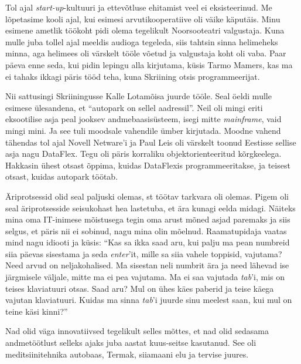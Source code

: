 
Tol ajal \emph{start-up}-kultuuri ja ettevõtluse ehitamist veel ei 
eksisteerinud. Me lõpetasime kooli ajal, kui esimesi 
arvutikooperatiive oli väike käputäis. Minu esimene ametlik töökoht pidi 
olema tegelikult Noorsooteatri valgustaja. Kuna mulle juba 
tollel ajal meeldis audioga tegeleda, siis tahtsin sinna helimeheks minna, 
aga helimees oli värskelt tööle võetud ja valgustaja koht oli vaba. Paar päeva 
enne seda, kui pidin lepingu alla kirjutama, 
küsis Tarmo Mamers, kas ma ei tahaks ikkagi päris 
tööd teha, kuna Skriining otsis programmeerijat. 

Nii sattusingi Skriiningusse Kalle Lotamõisa juurde 
tööle. Seal öeldi mulle esimese ülesandena, et \enquote{autopark on sellel 
aadressil}. 
Neil oli mingi eriti eksootilise asja peal jooksev andmebaasisüsteem, 
isegi mitte \emph{mainframe}, vaid mingi mini. Ja see tuli 
moodsale vahendile ümber kirjutada. Moodne vahend tähendas tol ajal Novell 
Netware'i ja Paul Leis oli värskelt toonud 
Eestisse sellise asja nagu DataFlex. Tegu oli päris 
 korraliku objektorienteeritud kõrgkeelega. Hakkasin ühest otsast õppima, 
kuidas DataFlexis programmeeritakse, ja 
teisest otsast, kuidas autopark töötab. 


Äriprotsessid olid seal paljuski olemas, st töötav tarkvara 
oli olemas. Pigem oli seal äriprotsesside seisukohast hea lastetuba, et ära 
kunagi eelda midagi. Näiteks mina oma IT-inimese mõistusega tegin oma 
arust mõned asjad paremaks ja siis selgus, et päris nii ei sobinud, nagu 
mina olin mõelnud. Raamatupidaja vaatas mind nagu idiooti ja küsis: 
\enquote{Kas sa ikka saad aru, kui palju ma pean numbreid siia päevas sisestama 
ja seda \emph{enter}'it, mille sa siia vahele toppisid, vajutama? Need arvud 
on neljakohalised. Ma sisestan neli numbrit ära ja 
need lähevad ise järgmisele väljale, mitte ma ei pea vajutama. Ma ei saa
vajutada \emph{tab}'i, mis on teises klaviatuuri otsas. Saad aru? Mul on ühes 
käes
paberid ja teise käega vajutan klaviatuuri. Kuidas ma sinna \emph{tab}'i juurde 
sinu 
meelest saan, kui mul on teine käsi kinni?} 

Nad olid väga innovatiivsed tegelikult selles mõttes, et nad olid 
sedasama andmetöötlust selleks ajaks juba aastat kuus-seitse kasutanud. See oli 
 meditsiinitehnika autobaas, Termak, siiamaani elu ja tervise 
juures. 


